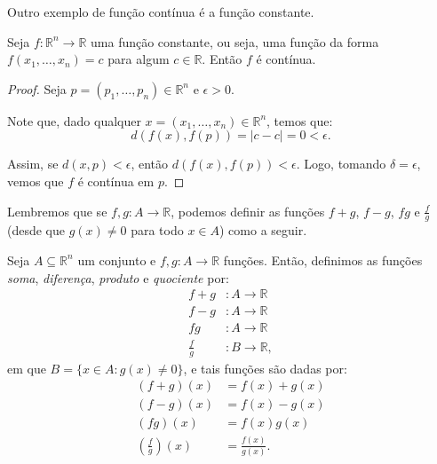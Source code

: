Outro exemplo de função contínua é a função constante.

\begin{proposition}
    Seja $f: \mathbb R^n\rightarrow \mathbb R$ uma função constante, ou seja, uma função da forma $f(x_1, \dots, x_n) = c$ para algum $c \in \mathbb R$.
    Então $f$ é contínua.
\end{proposition}
\begin{proof}
    Seja $p=(p_1, \dots, p_n) \in \mathbb R^n$ e $\epsilon>0$.

    Note que, dado qualquer $x=(x_1, \dots, x_n) \in \mathbb R^n$, temos que:
    \begin{equation*}
        d(f(x), f(p)) = |c - c| = 0 < \epsilon.
    \end{equation*}

    Assim, se $d(x, p)<\epsilon$, então $d(f(x), f(p))<\epsilon$.
    Logo, tomando $\delta=\epsilon$, vemos que $f$ é contínua em $p$.
\end{proof}

Lembremos que se $f, g: A \to \mathbb R$, podemos definir as funções $f+g$, $f-g$, $fg$ e $\frac{f}{g}$ (desde que $g(x)\neq 0$ para todo $x \in A$) como a seguir.

\begin{definition}
    Seja $A\subseteq \mathbb R^n$ um conjunto e $f, g: A \to \mathbb R$ funções.
    Então, definimos as funções \emph{soma}, \emph{diferença}, \emph{produto} e \emph{quociente} por:
    \begin{align*}
        f+g &: A\rightarrow \mathbb R \\
        f-g &: A\rightarrow \mathbb R \\
        fg &: A\rightarrow \mathbb R \\
        \frac{f}{g} &: B\rightarrow \mathbb R,
    \end{align*}
    em que $B=\{x \in A : g(x)\neq 0\}$, e tais funções são dadas por:
    \begin{align*}
        (f+g)(x) &= f(x) + g(x) \\
        (f-g)(x) &= f(x) - g(x) \\
        (fg)(x) &= f(x)g(x) \\
        \left(\frac{f}{g}\right)(x) &= \frac{f(x)}{g(x)}.
    \end{align*}
\end{definition}


